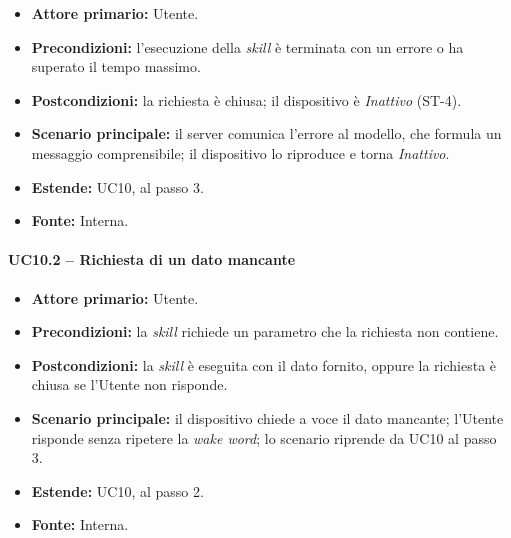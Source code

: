 \documentclass[12pt,a4paper]{article}
\newcommand{\tightlist}{\setlength{\itemsep}{1pt}\setlength{\parskip}{0pt}}
\begin{document}
\begin{itemize}

\tightlist

\item \textbf{Attore primario:} Utente.

\item \textbf{Precondizioni:} l'esecuzione della \emph{skill} è terminata con un errore o ha superato il tempo massimo.

\item \textbf{Postcondizioni:} la richiesta è chiusa; il dispositivo è \emph{Inattivo} (ST-4).

\item \textbf{Scenario principale:} il server comunica l'errore al modello, che formula un messaggio comprensibile; il dispositivo lo riproduce e torna \emph{Inattivo}.

\item \textbf{Estende:} UC10, al passo 3.

\item \textbf{Fonte:} Interna.

\end{itemize}



\paragraph{UC10.2 -- Richiesta di un dato mancante}

\begin{itemize}

\tightlist

\item \textbf{Attore primario:} Utente.

\item \textbf{Precondizioni:} la \emph{skill} richiede un parametro che la richiesta non contiene.

\item \textbf{Postcondizioni:} la \emph{skill} è eseguita con il dato fornito, oppure la richiesta è chiusa se l'Utente non risponde.

\item \textbf{Scenario principale:} il dispositivo chiede a voce il dato mancante; l'Utente risponde senza ripetere la \emph{wake word}; lo scenario riprende da UC10 al passo 3.

\item \textbf{Estende:} UC10, al passo 2.

\item \textbf{Fonte:} Interna.

\end{itemize}
\end{document}
